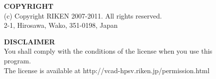 \documentclass[a4paper,10pt,oneside,fleqn]{jsbook}
\newcounter{program}
\begin{document}
\vspace{15cm}

\begin{description}
\item[ ] \textbf{COPYRIGHT}\\
(c) Copyright RIKEN 2007-2011. All rights reserved.\\
2-1, Hirosawa, Wako, 351-0198, Japan\\

\item[ ] \textbf{DISCLAIMER}\\
You shall comply with the conditions of the license when you use this program.\\
The license is available at http://vcad-hpsv.riken.jp/permission.html
\end{description}
%

\tableofcontents
%
%
\mainmatter


\end{document}
